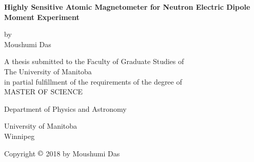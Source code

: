 \documentclass[12pt]{report}
\begin{document}
\begin{titlepage}
    \begin{center}
        \vspace*{0.5cm}
        
        {\large \textbf{Highly Sensitive Atomic Magnetometer for
            Neutron Electric Dipole Moment Experiment} }
        \vspace{0.5cm}
        {\large
        
        
        \vspace{1.5cm}
        by\\
        \vspace{0.9cm}
        Moushumi Das
        \vfill
        }
%
       \vspace{1.5cm}
       A thesis submitted to the Faculty of Graduate Studies of\\ The University of Manitoba\\
       in partial fulfillment of the requirements of the degree of\\
        \vspace{1.2cm}
        MASTER OF SCIENCE
        {\Large
        \vspace{0.8cm}
        
        \large
        Department of Physics and Astronomy
        
        University of Manitoba\\
        Winnipeg
  }
     

  \vspace{3.0cm}
        Copyright $\copyright$ 2018 by Moushumi Das
       \end{center}  
\end{titlepage}
\end{document}
